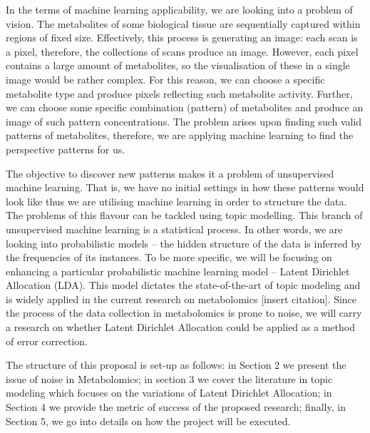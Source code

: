 \documentclass{mprop}
\begin{document}
\par In the terms of machine learning applicability, we are looking into a problem of vision. The metabolites of some biological tissue are sequentially captured within regions of fixed size. Effectively, this process is generating an image: each scan is a pixel, therefore, the collections of scans produce an image. However, each pixel contains a large amount of metabolites, so the visualisation of these in a single image would be rather complex. For this reason, we can choose a specific metabolite type and produce pixels reflecting such metabolite activity. Further, we can choose some specific combination (pattern) of metabolites and produce an image of such pattern concentrations. The problem arises upon finding such valid patterns of metabolites, therefore, we are applying machine learning to find the perspective patterns for us. 

\par The objective to discover new patterns makes it a problem of unsupervised machine learning. That is, we have no initial settings in how these patterns would look like thus we are utilising machine learning in order to structure the data. The problems of this flavour can be tackled using topic modelling. This branch of unsupervised machine learning is a statistical process. In other words, we are looking into probabilistic models -- the hidden structure of the data is inferred by the frequencies of its instances. To be more specific, we will be focusing on enhancing a particular probabilistic machine learning model -- Latent Dirichlet Allocation (LDA). This model dictates the state-of-the-art of topic modeling and is widely applied in the current research on metabolomics [insert citation]. Since the process of the data collection in metabolomics is prone to noise, we will carry a research on whether Latent Dirichlet Allocation could be applied as a method of error correction. 

\par The structure of this proposal is set-up as follows: in Section 2 we present the issue of noise in Metabolomics; in section 3 we cover the literature in topic modeling which focuses on the variations of Latent Dirichlet Allocation; in Section 4 we provide the metric of success of the proposed research; finally, in Section 5, we go into details on how the project will be executed.
\end{document}
